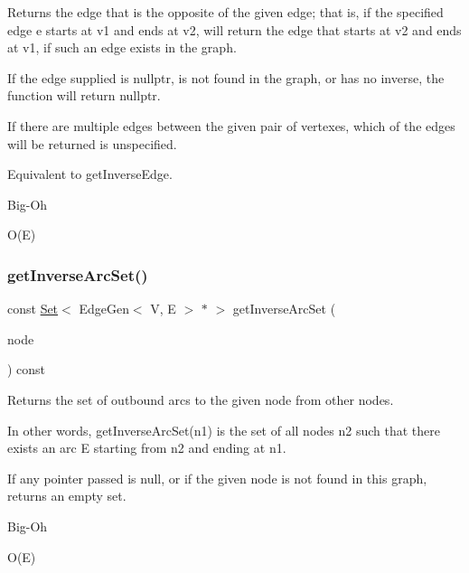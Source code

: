 Returns the edge that is the opposite of the given edge; that is, if the specified edge e starts at v1 and ends at v2, will return the edge that starts at v2 and ends at v1, if such an edge exists in the graph. 

If the edge supplied is nullptr, is not found in the graph, or has no inverse, the function will return nullptr.

If there are multiple edges between the given pair of vertexes, which of the edges will be returned is unspecified.

Equivalent to get\+Inverse\+Edge. \begin{DoxyRefDesc}{Big-\/\+Oh}
\item[\mbox{\hyperlink{BigOh__BigOh000022}{Big-\/\+Oh}}]O(\+E) \end{DoxyRefDesc}
\mbox{\label{classGraph_ad5fd149800cd46aae497b05b46059b63}} 
\subsubsection{\texorpdfstring{get\+Inverse\+Arc\+Set()}{getInverseArcSet()}\hspace{0.1cm}{\footnotesize\ttfamily [1/2]}}
{\footnotesize\ttfamily const \mbox{\hyperlink{classstanfordcpplib_1_1collections_1_1GenericSet}{Set}}$<$ Edge\+Gen$<$ V, E $>$  $\ast$ $>$ get\+Inverse\+Arc\+Set (\begin{DoxyParamCaption}\item[{\mbox{\hyperlink{classVertexGen}{Vertex\+Gen}}$<$ V, E $>$  $\ast$}]{node }\end{DoxyParamCaption}) const\hspace{0.3cm}{\ttfamily [inherited]}}



Returns the set of outbound arcs to the given node from other nodes. 

In other words, get\+Inverse\+Arc\+Set(n1) is the set of all nodes n2 such that there exists an arc E starting from n2 and ending at n1.

If any pointer passed is null, or if the given node is not found in this graph, returns an empty set. \begin{DoxyRefDesc}{Big-\/\+Oh}
\item[\mbox{\hyperlink{BigOh__BigOh000065}{Big-\/\+Oh}}]O(\+E) \end{DoxyRefDesc}
\mbox{\label{classGraph_a2cfe12e71ca594736a1e329461cff024}} 

